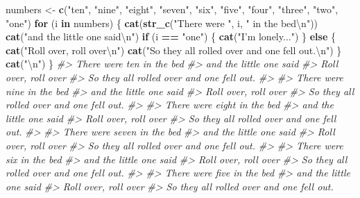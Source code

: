 \documentclass[]{book}
\newenvironment{Shaded}{\begin{snugshade}}{\end{snugshade}}
\newcommand{\CharTok}[1]{\textcolor[rgb]{0.31,0.60,0.02}{#1}}
\newcommand{\CommentTok}[1]{\textcolor[rgb]{0.56,0.35,0.01}{\textit{#1}}}
\newcommand{\ControlFlowTok}[1]{\textcolor[rgb]{0.13,0.29,0.53}{\textbf{#1}}}
\newcommand{\KeywordTok}[1]{\textcolor[rgb]{0.13,0.29,0.53}{\textbf{#1}}}
\newcommand{\NormalTok}[1]{#1}
\newcommand{\OperatorTok}[1]{\textcolor[rgb]{0.81,0.36,0.00}{\textbf{#1}}}
\newcommand{\StringTok}[1]{\textcolor[rgb]{0.31,0.60,0.02}{#1}}
\theoremstyle{plain}
\theoremstyle{remark}
\theoremstyle{definition}
\theoremstyle{definition}
\theoremstyle{definition}
\theoremstyle{remark}
\begin{document}
\begin{enumerate}
\begin{Shaded}
\begin{Highlighting}[]
\NormalTok{numbers <-}\StringTok{ }\KeywordTok{c}\NormalTok{(}\StringTok{"ten"}\NormalTok{, }\StringTok{"nine"}\NormalTok{, }\StringTok{"eight"}\NormalTok{, }\StringTok{"seven"}\NormalTok{, }\StringTok{"six"}\NormalTok{, }\StringTok{"five"}\NormalTok{,}
             \StringTok{"four"}\NormalTok{, }\StringTok{"three"}\NormalTok{, }\StringTok{"two"}\NormalTok{, }\StringTok{"one"}\NormalTok{)}
\ControlFlowTok{for}\NormalTok{ (i }\ControlFlowTok{in}\NormalTok{ numbers) \{}
  \KeywordTok{cat}\NormalTok{(}\KeywordTok{str_c}\NormalTok{(}\StringTok{"There were "}\NormalTok{, i, }\StringTok{" in the bed}\CharTok{\textbackslash{}n}\StringTok{"}\NormalTok{))}
  \KeywordTok{cat}\NormalTok{(}\StringTok{"and the little one said}\CharTok{\textbackslash{}n}\StringTok{"}\NormalTok{)}
  \ControlFlowTok{if}\NormalTok{ (i }\OperatorTok{==}\StringTok{ "one"}\NormalTok{) \{}
    \KeywordTok{cat}\NormalTok{(}\StringTok{"I'm lonely..."}\NormalTok{)}
\NormalTok{  \} }\ControlFlowTok{else}\NormalTok{ \{}
    \KeywordTok{cat}\NormalTok{(}\StringTok{"Roll over, roll over}\CharTok{\textbackslash{}n}\StringTok{"}\NormalTok{)}
    \KeywordTok{cat}\NormalTok{(}\StringTok{"So they all rolled over and one fell out.}\CharTok{\textbackslash{}n}\StringTok{"}\NormalTok{)}
\NormalTok{  \}}
  \KeywordTok{cat}\NormalTok{(}\StringTok{"}\CharTok{\textbackslash{}n}\StringTok{"}\NormalTok{)}
\NormalTok{\}}
\CommentTok{#> There were ten in the bed}
\CommentTok{#> and the little one said}
\CommentTok{#> Roll over, roll over}
\CommentTok{#> So they all rolled over and one fell out.}
\CommentTok{#> }
\CommentTok{#> There were nine in the bed}
\CommentTok{#> and the little one said}
\CommentTok{#> Roll over, roll over}
\CommentTok{#> So they all rolled over and one fell out.}
\CommentTok{#> }
\CommentTok{#> There were eight in the bed}
\CommentTok{#> and the little one said}
\CommentTok{#> Roll over, roll over}
\CommentTok{#> So they all rolled over and one fell out.}
\CommentTok{#> }
\CommentTok{#> There were seven in the bed}
\CommentTok{#> and the little one said}
\CommentTok{#> Roll over, roll over}
\CommentTok{#> So they all rolled over and one fell out.}
\CommentTok{#> }
\CommentTok{#> There were six in the bed}
\CommentTok{#> and the little one said}
\CommentTok{#> Roll over, roll over}
\CommentTok{#> So they all rolled over and one fell out.}
\CommentTok{#> }
\CommentTok{#> There were five in the bed}
\CommentTok{#> and the little one said}
\CommentTok{#> Roll over, roll over}
\CommentTok{#> So they all rolled over and one fell out.}

\end{Highlighting}
\end{Shaded}
\end{enumerate}
\end{document}
